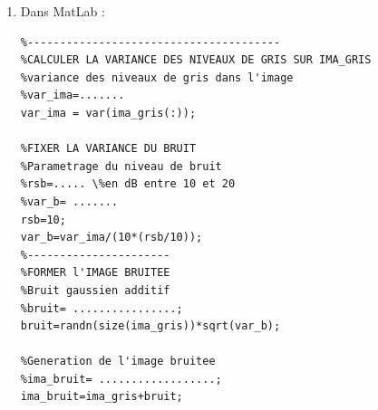\documentclass{article}
\begin{document}
\begin{enumerate}[label=\arabic*$\degres$)]
	\item Dans MatLab :
	
\begin{lstlisting}
%---------------------------------------
%CALCULER LA VARIANCE DES NIVEAUX DE GRIS SUR IMA_GRIS
%variance des niveaux de gris dans l'image 
%var_ima=....... 
var_ima = var(ima_gris(:));

%FIXER LA VARIANCE DU BRUIT
%Parametrage du niveau de bruit
%rsb=..... \%en dB entre 10 et 20
%var_b= .......
rsb=10;
var_b=var_ima/(10*(rsb/10));
%----------------------
%FORMER l'IMAGE BRUITEE
%Bruit gaussien additif
%bruit= ................;
bruit=randn(size(ima_gris))*sqrt(var_b);

%Generation de l'image bruitee
%ima_bruit= ..................;
ima_bruit=ima_gris+bruit;
\end{lstlisting}




\end{enumerate}
\end{document}
